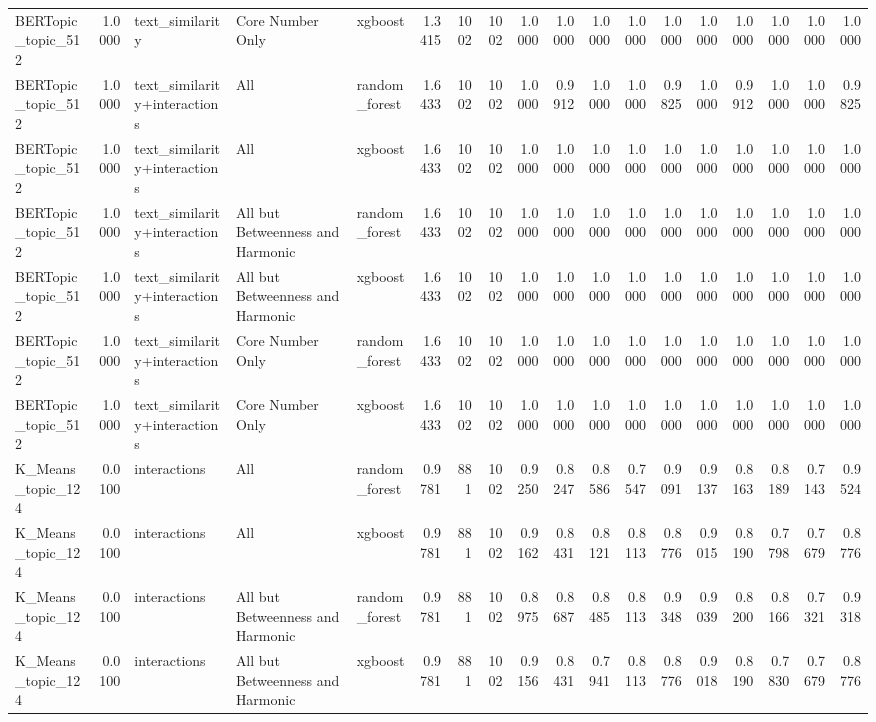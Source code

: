 \begin{tabular}{lrlllrrrrrrrrrrrrr}
BERTopic_topic_512 & 1.0000 & text_similarity & Core Number Only & xgboost & 1.3415 & 1002 & 1002 & 1.0000 & 1.0000 & 1.0000 & 1.0000 & 1.0000 & 1.0000 & 1.0000 & 1.0000 & 1.0000 & 1.0000 \\
BERTopic_topic_512 & 1.0000 & text_similarity+interactions & All & random_forest & 1.6433 & 1002 & 1002 & 1.0000 & 0.9912 & 1.0000 & 1.0000 & 0.9825 & 1.0000 & 0.9912 & 1.0000 & 1.0000 & 0.9825 \\
BERTopic_topic_512 & 1.0000 & text_similarity+interactions & All & xgboost & 1.6433 & 1002 & 1002 & 1.0000 & 1.0000 & 1.0000 & 1.0000 & 1.0000 & 1.0000 & 1.0000 & 1.0000 & 1.0000 & 1.0000 \\
BERTopic_topic_512 & 1.0000 & text_similarity+interactions & All but Betweenness and Harmonic & random_forest & 1.6433 & 1002 & 1002 & 1.0000 & 1.0000 & 1.0000 & 1.0000 & 1.0000 & 1.0000 & 1.0000 & 1.0000 & 1.0000 & 1.0000 \\
BERTopic_topic_512 & 1.0000 & text_similarity+interactions & All but Betweenness and Harmonic & xgboost & 1.6433 & 1002 & 1002 & 1.0000 & 1.0000 & 1.0000 & 1.0000 & 1.0000 & 1.0000 & 1.0000 & 1.0000 & 1.0000 & 1.0000 \\
BERTopic_topic_512 & 1.0000 & text_similarity+interactions & Core Number Only & random_forest & 1.6433 & 1002 & 1002 & 1.0000 & 1.0000 & 1.0000 & 1.0000 & 1.0000 & 1.0000 & 1.0000 & 1.0000 & 1.0000 & 1.0000 \\
BERTopic_topic_512 & 1.0000 & text_similarity+interactions & Core Number Only & xgboost & 1.6433 & 1002 & 1002 & 1.0000 & 1.0000 & 1.0000 & 1.0000 & 1.0000 & 1.0000 & 1.0000 & 1.0000 & 1.0000 & 1.0000 \\
K_Means_topic_124 & 0.0100 & interactions & All & random_forest & 0.9781 & 881 & 1002 & 0.9250 & 0.8247 & 0.8586 & 0.7547 & 0.9091 & 0.9137 & 0.8163 & 0.8189 & 0.7143 & 0.9524 \\
K_Means_topic_124 & 0.0100 & interactions & All & xgboost & 0.9781 & 881 & 1002 & 0.9162 & 0.8431 & 0.8121 & 0.8113 & 0.8776 & 0.9015 & 0.8190 & 0.7798 & 0.7679 & 0.8776 \\
K_Means_topic_124 & 0.0100 & interactions & All but Betweenness and Harmonic & random_forest & 0.9781 & 881 & 1002 & 0.8975 & 0.8687 & 0.8485 & 0.8113 & 0.9348 & 0.9039 & 0.8200 & 0.8166 & 0.7321 & 0.9318 \\
K_Means_topic_124 & 0.0100 & interactions & All but Betweenness and Harmonic & xgboost & 0.9781 & 881 & 1002 & 0.9156 & 0.8431 & 0.7941 & 0.8113 & 0.8776 & 0.9018 & 0.8190 & 0.7830 & 0.7679 & 0.8776 \\

\end{tabular}
